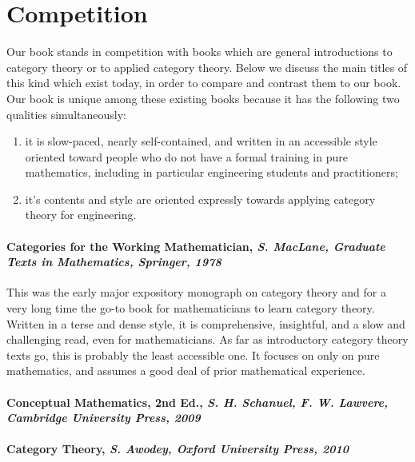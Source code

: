 \documentclass[10pt, article, one side]{memoir}
\begin{document}
    \section{Competition}
    
    Our book stands in competition with books which are general introductions to category theory or to applied category theory. Below we discuss the main titles of this kind which exist today, in order to compare and contrast them to our book.  Our book is unique among these existing books because it has the following two qualities simultaneously: 
\begin{enumerate}
\item it is slow-paced, nearly self-contained, and written in an accessible style oriented toward people who do not have a formal training in pure mathematics, including in particular engineering students and practitioners;
\item it's contents and style are oriented expressly towards applying category theory for engineering.  
\end{enumerate} 
    
\paragraph{Categories for the Working Mathematician, \emph{S. MacLane, Graduate Texts in Mathematics, Springer, 1978}}

This was the early major expository monograph on category theory and for a very long time the go-to book for mathematicians to learn category theory. Written in a terse and dense style, it is comprehensive, insightful, and a slow and challenging read, even for mathematicians. As far as introductory category theory texts go, this is probably the least accessible one. It focuses on only on pure mathematics, and assumes a good deal of prior mathematical experience. 

\paragraph{Conceptual Mathematics, 2nd Ed., \emph{S. H. Schanuel, F. W. Lawvere, Cambridge University Press, 2009}}

\paragraph{Category Theory, \emph{S. Awodey, Oxford University Press, 2010}}
\end{document}
